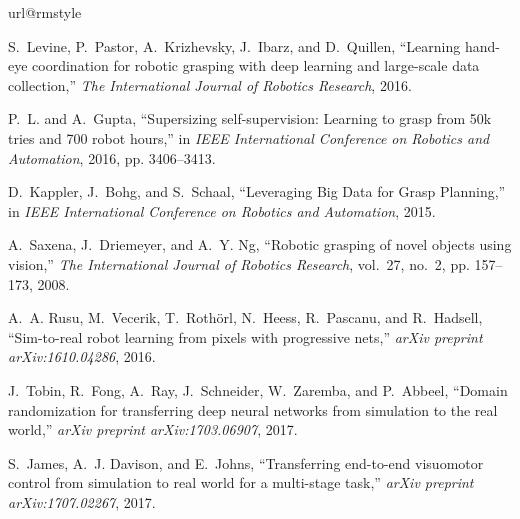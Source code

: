 \documentclass[letterpaper, 10 pt, conference]{ieeeconf}  %
\begin{document}
\begin{thebibliography}{10}
\providecommand{\url}[1]{#1}
\csname url@rmstyle\endcsname
\providecommand{\newblock}{\relax}
\providecommand{\bibinfo}[2]{#2}
\providecommand\BIBentrySTDinterwordspacing{\spaceskip=0pt\relax}
\providecommand\BIBentryALTinterwordstretchfactor{4}
\providecommand\BIBentryALTinterwordspacing{\spaceskip=\fontdimen2\font plus
\BIBentryALTinterwordstretchfactor\fontdimen3\font minus
  \fontdimen4\font\relax}
\providecommand\BIBforeignlanguage[2]{{%
\expandafter\ifx\csname l@#1\endcsname\relax
\typeout{** WARNING: IEEEtran.bst: No hyphenation pattern has been}%
\typeout{** loaded for the language `#1'. Using the pattern for}%
\typeout{** the default language instead.}%
\else
\language=\csname l@#1\endcsname
\fi
#2}}

S.~Levine, P.~Pastor, A.~Krizhevsky, J.~Ibarz, and D.~Quillen, ``Learning
  hand-eye coordination for robotic grasping with deep learning and large-scale
  data collection,'' \emph{The International Journal of Robotics Research},
  2016.

P.~L. and A.~Gupta, ``Supersizing self-supervision: Learning to grasp from 50k
  tries and 700 robot hours,'' in \emph{IEEE International Conference on
  Robotics and Automation}, 2016, pp. 3406--3413.

D.~Kappler, J.~Bohg, and S.~Schaal, ``{Leveraging Big Data for Grasp
  Planning},'' in \emph{IEEE International Conference on Robotics and
  Automation}, 2015.

A.~Saxena, J.~Driemeyer, and A.~Y. Ng, ``Robotic grasping of novel objects
  using vision,'' \emph{The International Journal of Robotics Research},
  vol.~27, no.~2, pp. 157--173, 2008.

A.~A. Rusu, M.~Vecerik, T.~Roth{\"o}rl, N.~Heess, R.~Pascanu, and R.~Hadsell,
  ``Sim-to-real robot learning from pixels with progressive nets,'' \emph{arXiv
  preprint arXiv:1610.04286}, 2016.

J.~Tobin, R.~Fong, A.~Ray, J.~Schneider, W.~Zaremba, and P.~Abbeel, ``Domain
  randomization for transferring deep neural networks from simulation to the
  real world,'' \emph{arXiv preprint arXiv:1703.06907}, 2017.

S.~James, A.~J. Davison, and E.~Johns, ``Transferring end-to-end visuomotor
  control from simulation to real world for a multi-stage task,'' \emph{arXiv
  preprint arXiv:1707.02267}, 2017.


\end{thebibliography}
\end{document}
